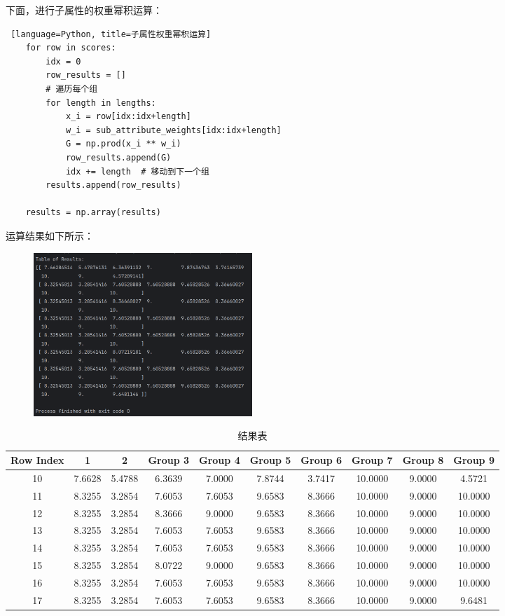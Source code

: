\documentclass[14pt,a4paper,UTF8,twoside]{article}
\begin{document}
下面，进行子属性的权重幂积运算：

\begin{lstlisting} [language=Python, title=子属性权重幂积运算]
	for row in scores:
		idx = 0
		row_results = []
		# 遍历每个组
		for length in lengths:
			x_i = row[idx:idx+length]
			w_i = sub_attribute_weights[idx:idx+length]
			G = np.prod(x_i ** w_i)
			row_results.append(G)
			idx += length  # 移动到下一个组
		results.append(row_results)
	
	results = np.array(results)
\end{lstlisting}

运算结果如下所示：

\begin{figure}[H]
	\centering
	\includegraphics[width=0.4\textwidth]{img7/result1.png}
\end{figure}

\begin{table}[H]
	\centering
	\begin{tabular}{c|ccccccccc}
	\toprule
	\textbf{Row Index} &\textbf{1} & \textbf{2} & \textbf{Group 3} & \textbf{Group 4} & \textbf{Group 5} & \textbf{Group 6} & \textbf{Group 7} & \textbf{Group 8} & \textbf{Group 9} \\
	\midrule
	10 & 7.6628 & 5.4788 & 6.3639 & 7.0000 & 7.8744 & 3.7417 & 10.0000 & 9.0000 & 4.5721 \\
	11 & 8.3255 & 3.2854 & 7.6053 & 7.6053 & 9.6583 & 8.3666 & 10.0000 & 9.0000 & 10.0000 \\
	12 & 8.3255 & 3.2854 & 8.3666 & 9.0000 & 9.6583 & 8.3666 & 10.0000 & 9.0000 & 10.0000 \\
	13 & 8.3255 & 3.2854 & 7.6053 & 7.6053 & 9.6583 & 8.3666 & 10.0000 & 9.0000 & 10.0000 \\
	14 & 8.3255 & 3.2854 & 7.6053 & 7.6053 & 9.6583 & 8.3666 & 10.0000 & 9.0000 & 10.0000 \\
	15 & 8.3255 & 3.2854 & 8.0722 & 9.0000 & 9.6583 & 8.3666 & 10.0000 & 9.0000 & 10.0000 \\
	16 & 8.3255 & 3.2854 & 7.6053 & 7.6053 & 9.6583 & 8.3666 & 10.0000 & 9.0000 & 10.0000 \\
	17 & 8.3255 & 3.2854 & 7.6053 & 7.6053 & 9.6583 & 8.3666 & 10.0000 & 9.0000 & 9.6481 \\
	\bottomrule
	\end{tabular}
	\caption{结果表}
\end{table}
\end{document}
